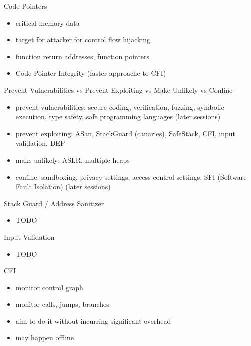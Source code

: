 \documentclass{curs}
\begin{document}
\begin{frame}{Code Pointers}
  \begin{itemize}
    \item critical memory data
    \item target for attacker for control flow hijacking
    \item function return addresses, function pointers
    \item Code Pointer Integrity (faster approache to CFI)
  \end{itemize}
\end{frame}

\begin{frame}{Prevent Vulnerabilities vs Prevent Exploiting vs Make Unlikely vs Confine}
  \begin{itemize}
    \item prevent vulnerabilities: secure coding, verification, fuzzing, symbolic execution, type safety, safe programming languages (later sessions)
    \item prevent exploiting: ASan, StackGuard (canaries), SafeStack, CFI, input validation, DEP
    \item make unlikely: ASLR, multiple heaps
    \item confine: sandboxing, privacy settings, access control settings, SFI (Software Fault Isolation) (later sessions)
  \end{itemize}
\end{frame}

\begin{frame}{Stack Guard / Address Sanitizer}
  \begin{itemize}
    \item TODO
  \end{itemize}
\end{frame}

\begin{frame}{Input Validation}
  \begin{itemize}
    \item TODO
  \end{itemize}
\end{frame}

\begin{frame}{CFI}
  \begin{itemize}
    \item monitor control graph
    \item monitor calls, jumps, branches
    \item aim to do it without incurring significant overhead
    \item may happen offline
  \end{itemize}
\end{frame}
\end{document}
